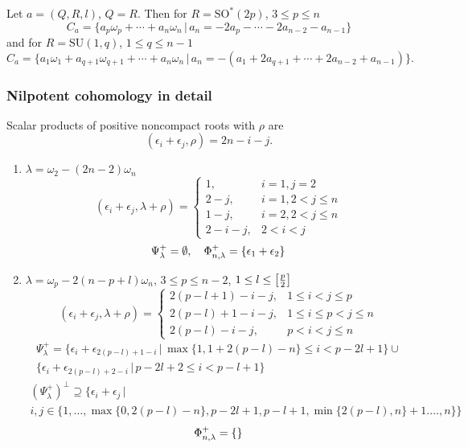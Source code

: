 Let $a=(Q,R,l)$, $Q=R$. Then for $R=\mathrm{SO}^*(2p)$, $3\leq p\leq n$
\[
 C_a = \{a_p\omega_p+\cdots + a_n\omega_n \,|\, a_n = -2a_p - \cdots -2a_{n-2} - a_{n-1}\}
\]
and for  $R=\mathrm{SU}(1,q)$, $1\leq q \leq n-1$
\[
 C_a = \{a_1\omega_1 + a_{q+1}\omega_{q+1} + \cdots + a_n\omega_n \,|\, a_n = -(a_1 + 2a_{q+1} + \cdots + 2a_{n-2} + a_{n-1})\}.
\]

\subsubsection{Nilpotent cohomology in detail}

Scalar products of positive noncompact roots with $\rho$ are
\[
 (\epsilon_i + \epsilon_j, \rho) = 2n - i -j.
\]

\begin{enumerate}
 \item $\lambda =  \omega_2 - (2n-2)\omega_n $\\
  \[
   (\epsilon_i + \epsilon_j,\lambda+\rho) = \begin{cases}
                                             1, &  i=1,j=2 \\
                                             2-j, & i=1, 2 < j \leq n\\
                                             1-j, & i=2, 2 < j \leq n \\
                                             2-i-j, & 2 < i < j
                                            \end{cases}
  \]
  \[
   \Psi^+_\lambda = \emptyset, \quad \Phi^+_{n,\lambda} = \{ \epsilon_1 + \epsilon_2 \}
  \]

 \item $\lambda = \omega_p -2(n-p+l) \omega_n$, $3\leq p \leq n-2$, $1\leq l \leq \left[ \frac{p}{2} \right]$\\
  \[
   (\epsilon_i + \epsilon_j,\lambda+\rho) = \begin{cases}
                                             2(p-l+1)-i-j, & 1\leq i < j \leq p \\
                                             2(p-l)+1-i-j, & 1 \leq i \leq p < j \leq n\\
                                             2(p-l)-i-j, &  p <i < j \leq n
                                            \end{cases}
  \]
  \begin{multline*}
   \Psi^+_\lambda = \{ \epsilon_i + \epsilon_{2(p-l)+1-i} \,|\, \max\{1,1+2(p-l)-n\} \leq i < p-2l+1 \} \cup \\  \{ \epsilon_i + \epsilon_{2(p-l)+2-i} \,|\, p-2l+2 \leq i < p-l+1 \}
  \end{multline*}
  \begin{multline*}
   (\Psi^+_\lambda)^\perp \supseteq \{ \epsilon_i + \epsilon_j \,|\, \\ i,j \in \{ 1,\ldots,\max\{0,2(p-l)-n\},p-2l+1,p-l+1,\min\{ 2(p-l),n \}+1.\ldots,n \} \}
  \end{multline*}
  \[
   \Phi^+_{n,\lambda} = \{ \}
  \]


\end{enumerate}
